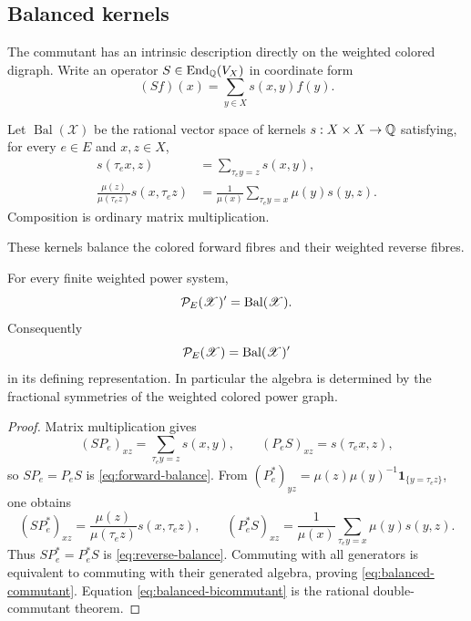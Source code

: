 \subsection{Balanced kernels}
\label{sec:reconstruction}

The commutant has an intrinsic description directly on the weighted colored
digraph.  Write an operator \(S\in\operatorname{End}_\mathbb Q(V_X)\) in coordinate form
\[
 (Sf)(x)=\sum_{y\in X}s(x,y)f(y).
\]

\begin{definition}
\label{def:balanced-kernels}
Let \(\operatorname{Bal}(\mathscr X)\) be the rational vector space of
kernels \(s:X\times X\to\mathbb Q\) satisfying, for every \(e\in E\) and
\(x,z\in X\),
\begin{align}
 s(\tau_e x,z)
 &=\sum_{\tau_e y=z}s(x,y),
 \label{eq:forward-balance}\\
 \frac{\mu(z)}{\mu(\tau_e z)}s(x,\tau_e z)
 &=\frac1{\mu(x)}
   \sum_{\tau_e y=x}\mu(y)s(y,z).
 \label{eq:reverse-balance}
\end{align}
Composition is ordinary matrix multiplication.
\end{definition}

These kernels balance the colored forward fibres and their weighted reverse
fibres.

\begin{theorem}
\label{thm:balanced-commutant}
For every finite weighted power system,
\begin{equation}
 \mathcal P_E(\mathscr X)'=\operatorname{Bal}(\mathscr X).
 \label{eq:balanced-commutant}
\end{equation}
Consequently
\begin{equation}
 \mathcal P_E(\mathscr X)
 =\operatorname{Bal}(\mathscr X)'
 \label{eq:balanced-bicommutant}
\end{equation}
in its defining representation.  In particular the algebra is determined
by the fractional symmetries of the weighted colored power graph.
\end{theorem}

\begin{proof}
Matrix multiplication gives
\[
 (SP_e)_{xz}=\sum_{\tau_e y=z}s(x,y),\qquad
 (P_eS)_{xz}=s(\tau_ex,z),
\]
so \(SP_e=P_eS\) is \eqref{eq:forward-balance}.  From
\((P_e^*)_{yz}=\mu(z)\mu(y)^{-1}\mathbf1_{\{y=\tau_ez\}}\), one obtains
\[
 (SP_e^*)_{xz}=\frac{\mu(z)}{\mu(\tau_ez)}s(x,\tau_ez),\qquad
 (P_e^*S)_{xz}=\frac1{\mu(x)}
 \sum_{\tau_ey=x}\mu(y)s(y,z).
\]
Thus \(SP_e^*=P_e^*S\) is \eqref{eq:reverse-balance}.  Commuting with all
generators is equivalent to commuting with their generated algebra, proving
\eqref{eq:balanced-commutant}.  Equation
\eqref{eq:balanced-bicommutant} is the rational double-commutant theorem.
\end{proof}

